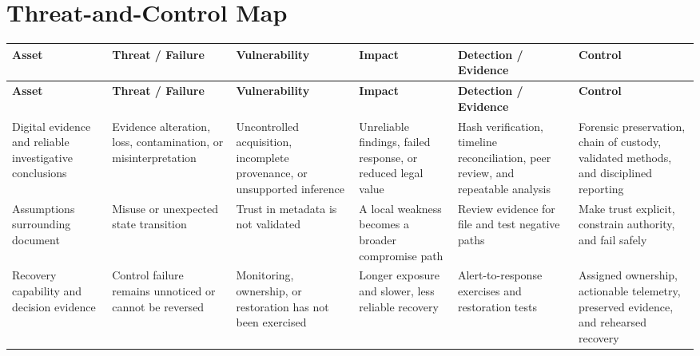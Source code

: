 \documentclass[11pt]{article}
\begin{document}
\section*{Threat-and-Control Map}
\begingroup\scriptsize\setlength{\tabcolsep}{2pt}
\begin{longtable}{>{\RaggedRight\arraybackslash}p{}>{\RaggedRight\arraybackslash}p{}>{\RaggedRight\arraybackslash}p{}>{\RaggedRight\arraybackslash}p{}>{\RaggedRight\arraybackslash}p{}>{\RaggedRight\arraybackslash}p{}}
\toprule\rowcolor{Navy}\color{white}\textbf{Asset} & \color{white}\textbf{Threat / Failure} & \color{white}\textbf{Vulnerability} & \color{white}\textbf{Impact} & \color{white}\textbf{Detection / Evidence} & \color{white}\textbf{Control}\\\midrule
\endfirsthead
\toprule\rowcolor{Navy}\color{white}\textbf{Asset} & \color{white}\textbf{Threat / Failure} & \color{white}\textbf{Vulnerability} & \color{white}\textbf{Impact} & \color{white}\textbf{Detection / Evidence} & \color{white}\textbf{Control}\\\midrule
\endhead
Digital evidence and reliable investigative conclusions & Evidence alteration, loss, contamination, or misinterpretation & Uncontrolled acquisition, incomplete provenance, or unsupported inference & Unreliable findings, failed response, or reduced legal value & Hash verification, timeline reconciliation, peer review, and repeatable analysis & Forensic preservation, chain of custody, validated methods, and disciplined reporting\\\midrule
Assumptions surrounding document & Misuse or unexpected state transition & Trust in metadata is not validated & A local weakness becomes a broader compromise path & Review evidence for file and test negative paths & Make trust explicit, constrain authority, and fail safely\\\midrule
Recovery capability and decision evidence & Control failure remains unnoticed or cannot be reversed & Monitoring, ownership, or restoration has not been exercised & Longer exposure and slower, less reliable recovery & Alert-to-response exercises and restoration tests & Assigned ownership, actionable telemetry, preserved evidence, and rehearsed recovery\\\midrule
\bottomrule
\end{longtable}
\endgroup
\end{document}
